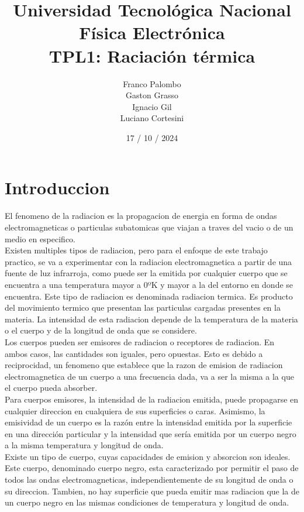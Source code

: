 \documentclass[a4paper,12pt]{report}
\title{%
  \fontsize{25}{0}\selectfont Universidad Tecnológica Nacional \\
  \fontsize{22}{30}\selectfont Física Electrónica \\
  \fontsize{18}{25}\selectfont TPL1: Raciación térmica
}
\author{
Franco Palombo\\
Gaston Grasso\\
Ignacio Gil\\
Luciano Cortesini\\
}
\date{17 / 10 / 2024}
\begin{document}
\maketitle

\chapter{Introduccion}
  El fenomeno de la radiacion es la propagacion de energia en forma de ondas electromagneticas o particulas subatomicas
  que viajan a traves del vacio o de un medio en especifico.\\

  Existen multiples tipos de radiacion, pero para el enfoque de este trabajo practico, se va a experimentar con la
  radiacion electromagnetica a partir de una fuente de luz infrarroja, como puede ser la emitida por cualquier cuerpo
  que se encuentra a una temperatura mayor a 0ºK y mayor a la del entorno en donde se encuentra. Este tipo de radiacion
  es denominada radiacion termica. Es producto del movimiento termico que presentan las particulas cargadas presentes
  en la materia. La intensidad de esta radiacion depende de la temperatura de la materia o el cuerpo y de la longitud
  de onda que se considere.\\

  Los cuerpos pueden ser emisores de radiacion o receptores de radiacion. En ambos casos, las cantidades son iguales,
  pero opuestas. Esto es debido a reciprocidad, un fenomeno que establece que la razon de emision de radiacion
  electromagnetica de un cuerpo a una frecuencia dada, va a ser la misma a la que el cuerpo pueda absorber.\\

  Para cuerpos emisores, la intensidad de la radiacion emitida, puede propagarse en cualquier direccion en cualquiera
  de sus superficies o caras. Asimismo, la emisividad de un cuerpo es la razón entre la intensidad emitida por la
  superficie en una dirección particular y la intensidad que sería emitida por un cuerpo negro a la misma temperatura y
  longitud de onda.\\

  Existe un tipo de cuerpo, cuyas capacidades de emision y absorcion son ideales. Este cuerpo, denominado cuerpo negro,
  esta caracterizado por permitir el paso de todos las ondas electromagneticas, independientemente de su longitud de
  onda o su direccion. Tambien, no hay superficie que pueda emitir mas radiacion que la de un cuerpo negro en las
  mismas condiciones de temperatura y longitud de onda.\\
\end{document}
